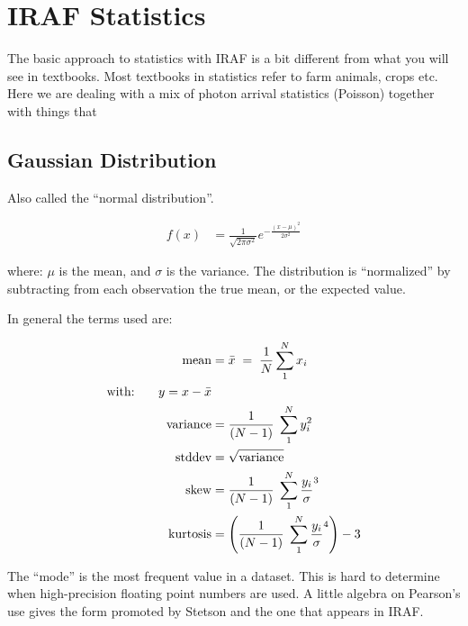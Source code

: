 \renewcommand{\footerfilename}{Statistics.tex}

\clearpage
\section{IRAF Statistics}

The basic approach to statistics with IRAF is a bit different from what you
will see in textbooks. Most textbooks in statistics refer to farm animals,
crops etc. Here we are dealing with a mix of photon arrival statistics
(Poisson) together with things that 


\subsection{Gaussian Distribution}

Also called the ``normal distribution''. 


\begin{subequations}
\begin{align}
f(x) &= \frac{1}{\sqrt{2\pi\sigma^2} } e^{-\frac{(x-\mu)^2}{2\sigma^2}}
\end{align}
\end{subequations}

where:  $\mu$ is the mean, and $\sigma$ is the variance. The distribution is
``normalized'' by subtracting from each observation the true mean, or the expected
value.

\clearpage
In general the terms used are:

\begin{subequations}
\begin{align}
    \textrm{mean} &= \bar{x} \;=\; \frac{1}{N}\sum_{1}^{N} x_{i} \\
\textrm{with:~ ~ ~}  y = x - \bar{x} \notag \\
\textrm{variance} &= \frac{1}{(N-1)}\;\sum_{1}^{N} y_{i}^{2} \\
  \textrm{stddev} &= \sqrt{\textrm{variance}} \\
    \textrm{skew} &= \frac{1}{(N-1)}\;\sum_{1}^{N} \frac{y_{i}}{\sigma}^{3} \\
\textrm{kurtosis} &= \left(  \frac{1}{(N-1)}\;\sum_{1}^{N} \frac{y_{i}}{\sigma}^{4} \right) -3
\end{align}
\end{subequations}

The ``mode'' \cite{wiki-stetson} is the most frequent value in a
dataset. This is hard to determine when high-precision floating point
numbers are used. A little algebra on Pearson's use gives the form
promoted by Stetson and the one that appears in IRAF.


